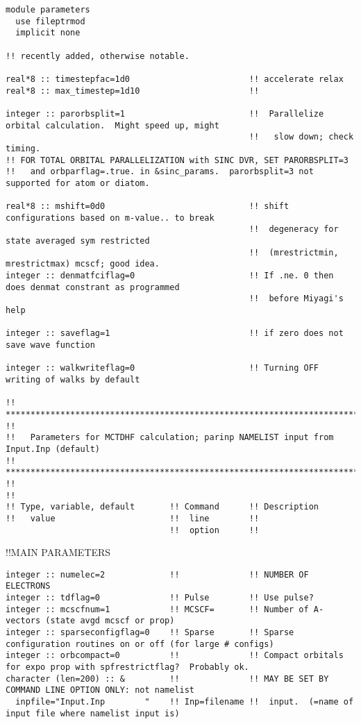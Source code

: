 \begin{verbatim}
module parameters
  use fileptrmod
  implicit none

!! recently added, otherwise notable. 

real*8 :: timestepfac=1d0                        !! accelerate relax
real*8 :: max_timestep=1d10                      !!

integer :: parorbsplit=1                         !!  Parallelize orbital calculation.  Might speed up, might
                                                 !!   slow down; check timing.
!! FOR TOTAL ORBITAL PARALLELIZATION with SINC DVR, SET PARORBSPLIT=3
!!   and orbparflag=.true. in &sinc_params.  parorbsplit=3 not supported for atom or diatom.

real*8 :: mshift=0d0                             !! shift configurations based on m-value.. to break 
                                                 !!  degeneracy for state averaged sym restricted
                                                 !!  (mrestrictmin, mrestrictmax) mcscf; good idea.
integer :: denmatfciflag=0                       !! If .ne. 0 then does denmat constrant as programmed
                                                 !!  before Miyagi's help

integer :: saveflag=1                            !! if zero does not save wave function

integer :: walkwriteflag=0                       !! Turning OFF writing of walks by default

!! *********************************************************************************************************** !!
!!   Parameters for MCTDHF calculation; parinp NAMELIST input from Input.Inp (default)
!! *********************************************************************************************************** !!
!!
!! Type, variable, default       !! Command      !! Description 
!!   value                       !!  line        !! 
                                 !!  option      !!
\end{verbatim}
!!{\large \quad MAIN PARAMETERS }
\begin{verbatim}
integer :: numelec=2             !!              !! NUMBER OF ELECTRONS
integer :: tdflag=0              !! Pulse        !! Use pulse?
integer :: mcscfnum=1            !! MCSCF=       !! Number of A-vectors (state avgd mcscf or prop)
integer :: sparseconfigflag=0    !! Sparse       !! Sparse configuration routines on or off (for large # configs)
integer :: orbcompact=0          !!              !! Compact orbitals for expo prop with spfrestrictflag?  Probably ok.
character (len=200) :: &         !!              !! MAY BE SET BY COMMAND LINE OPTION ONLY: not namelist
  inpfile="Input.Inp        "    !! Inp=filename !!  input.  (=name of input file where namelist input is)
\end{verbatim}
